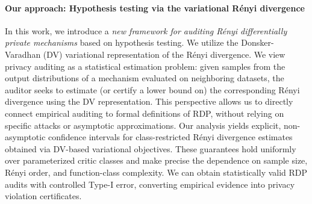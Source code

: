 \documentclass{article}
\theoremstyle{plain}
\theoremstyle{definition}
\theoremstyle{remark}
\begin{document}
\paragraph{Our approach: Hypothesis testing via the variational R\'enyi divergence}
In this work, we introduce a \emph{new framework for auditing R\'enyi differentially private mechanisms}
based on hypothesis
testing.
We utilize %
the Donsker-Varadhan (DV) variational representation of the R\'enyi divergence.
We view privacy auditing as a statistical estimation problem: given samples from the output distributions of a 
mechanism evaluated on neighboring datasets, the auditor seeks to estimate (or certify a lower bound on) the
corresponding R\'enyi divergence using the DV representation.
This perspective allows us to directly connect empirical auditing to
formal definitions of RDP, without relying on specific attacks or asymptotic approximations.
Our analysis yields explicit, non-asymptotic confidence intervals for class-restricted R\'enyi divergence estimates
obtained via DV-based variational objectives.
These guarantees hold uniformly over parameterized critic classes and make precise the dependence on sample size,
R\'enyi order, and function-class complexity. We can obtain statistically valid RDP audits with controlled
Type-I error, converting empirical evidence into privacy violation certificates. 



\end{document}
